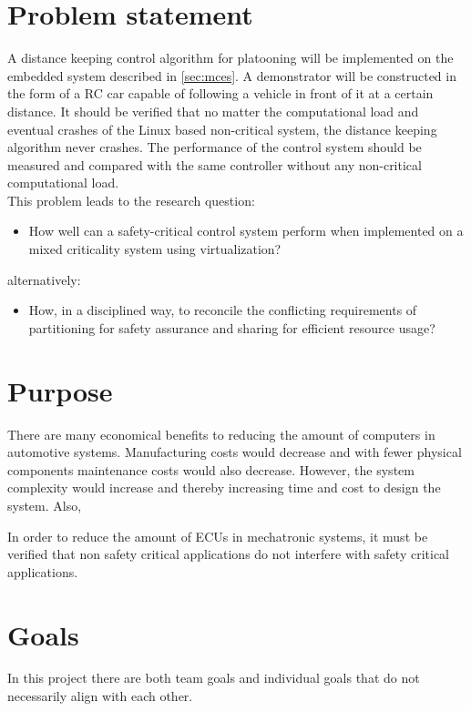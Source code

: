 \section{Problem statement}
A distance keeping control algorithm for platooning will be implemented on the embedded system described in \ref{sec:mces}. A demonstrator will be constructed in the form of a RC car capable of following a vehicle in front of it at a certain distance. It should be verified that no matter the computational load and eventual crashes of the Linux based non-critical system, the distance keeping algorithm never crashes. The performance of the control system should be measured and compared with the same controller without any non-critical computational load.\\

This problem leads to the research question: 
\begin{itemize}
\item How well can a safety-critical control system perform when implemented on a mixed criticality system using virtualization?
\end{itemize}
alternatively:
\begin{itemize}
\item How, in a disciplined way, to reconcile the conflicting requirements of partitioning for safety assurance and sharing for efficient resource usage?
\end{itemize}

\section{Purpose}
There are many economical benefits to reducing the amount of computers in automotive systems. Manufacturing costs would decrease and with fewer physical components maintenance costs would also decrease. However, the system complexity would increase and thereby increasing time and cost to design the system. Also,

In order to reduce the amount of ECUs in mechatronic systems, it must be verified that non safety critical applications do not interfere with safety critical applications.

\section{Goals}
In this project there are both team goals and individual goals that do not necessarily align with each other. 

